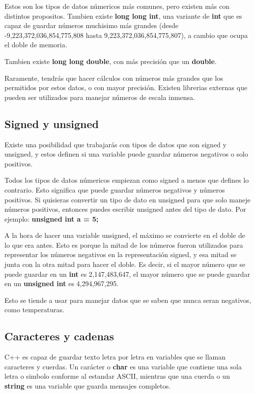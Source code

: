 \documentclass{article}
\begin{document}
Estos son los tipos de datos númericos más comunes, pero existen más con distintos propositos. Tambien existe \textbf{long long int}, una variante de \textbf{int} que es capaz de guardar números muchisimo más grandes (desde -9,223,372,036,854,775,808 hasta 9,223,372,036,854,775,807), a cambio que ocupa el doble de memoria.

Tambien existe \textbf{long long double}, con más precisión que un \textbf{double}.

Raramente, tendrás que hacer cálculos con números más grandes que los permitidos por estos datos, o con mayor precisión. Existen librerias externas que pueden ser utilizados para manejar números de escala inmensa.

\subsection{Signed y unsigned}

Existe una posibilidad que trabajarás con tipos de datos que son signed y unsigned, y estos definen si una variable puede guardar números negativos o solo positivos.

Todos los tipos de datos númericos empiezan como signed a menos que defines lo contrario. Esto significa que puede guardar números negativos y números positivos. Si quisieras convertir un tipo de dato en unsigned para que solo maneje números positivos, entonces puedes escribir unsigned antes del tipo de dato. Por ejemplo: \textbf{unsigned int a = 5;}

A la hora de hacer una variable unsigned, el máximo se convierte en el doble de lo que era antes. Esto es porque la mitad de los números fueron utilizados para representar los números negativos en la representación signed, y esa mitad se junta con la otra mitad para hacer el doble. Es decir, si el mayor número que se puede guardar en un \textbf{int} es 2,147,483,647, el mayor número que se puede guardar en un \textbf{unsigned int} es 4,294,967,295.

Esto se tiende a usar para manejar datos que se saben que nunca seran negativos, como temperaturas.

\subsection{Caracteres y cadenas}

C++ es capaz de guardar texto letra por letra en variables que se llaman caracteres y cuerdas. Un carácter o \textbf{char} es una variable que contiene una sola letra o simbolo conforme al estandar ASCII, mientras que una cuerda o un \textbf{string} es una variable que guarda mensajes completos.
\end{document}

